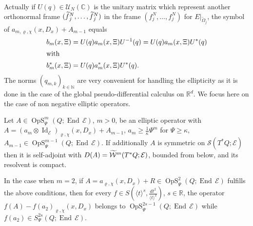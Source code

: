 \documentclass[AHL,Unicode,longabstracts]{cedram}
\newcommand{\C}{\mathbb{C}}
\newcommand{\R}{\mathbb{R}}
\newcommand{\N}{\mathbb{N}}
\newcommand{\clW}{\mathcal{W}}
\newcommand{\clE}{\mathcal{E}}
\newcommand{\clS}{\mathcal{S}}
\newcommand{\clU}{\mathcal{U}}
\DeclareMathOperator{\End}{End}
\DeclareMathOperator{\OpS}{OpS}
\DeclareMathOperator{\Idd}{Id}
\let\oldtilde\tilde
\renewcommand*{\tilde}[1]{\mathchoice{\widetilde{#1}}{\widetilde{#1}}{\oldtilde{#1}}{\oldtilde{#1}}}
\begin{document}
Actually if $U(q)\in \clU_{N}(\C)$ is the unitary matrix which represent another orthonormal frame $(\tilde{f}_{j}^{N},\dots,\tilde{f}_{j}^{N})$ in the frame $(f_{j}^{N},\dots,f_{j}^{N})$ for $E|_{\widetilde{\Omega}_{j}}$, the symbol of $a_{m,\varrho,\chi}(x,D_{x})+A_{m-1}$ equals
\begin{align*} b_{m}(x,\Xi)&=U(q)a_{m}(x,\Xi)U^{-1}(q)=U(q)a_{m}(x,\Xi)U^{*}(q)\\
\intertext{with} b_{m}^{*}(x,\Xi)&=U(q)a_{m}^{*}(x,\Xi)U^{*}(q).
\end{align*}
The norms $(q_{m,k})_{k\in \N}$ are very convenient for handling the ellipticity as it is done in the case of the global pseudo-differential calculus on $\R^{d}$. We focus here on the case of non negative elliptic operators.
\begin{prop}\label{pr:HeSj}
Let $A\in \OpS^{m}_{\Psi}(Q;\End\,\clE)$, $m>0$, be an elliptic operator with $A=(a_{m}\otimes \Idd_{\clE})_{\varrho,\chi}(x,D_{x})+A_{m-1}$, $a_{m}\geq \frac{1}{\kappa}\Psi^{m}$ for $\Psi\geq \kappa$, $A_{m-1}\in \OpS^{m-1}_{\Psi}(Q;\End\,\clE)$. If additionally $A$ is symmetric on $\clS(T^{*}Q;\clE)$ then it is self-adjoint with $D(A)=\tilde{\clW}^{m}(T^{*}Q;\clE)$, bounded from below, and its resolvent is compact.

In the case when $m=2$, if $A=a_{\varrho,\chi}(x,D_{x})+R\in \OpS^{2}_{\Psi}(Q;\End\,\clE)$ fulfills the above conditions, then for every $f\in S(\langle t\rangle^{s},\frac{dt^{2}}{\langle t\rangle^{2}})$, $s\in \R$, the operator $f(A)-f(a_{2})_{\varrho,\chi}(x,D_{x})$ belongs to $\OpS^{2s-1}_{\Psi}(Q;\End\,\clE)$ while $f(a_{2})\in S^{2s}_{\Psi}(Q;\End\,\clE)$.
\end{prop}
\end{document}
